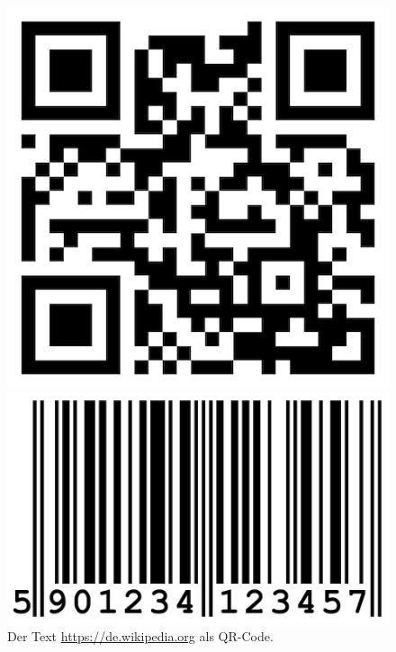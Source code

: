 \begin{figure}[htb]
\centering
\begin{minipage}{0.3\textwidth}
\centering
\includegraphics[scale=0.15]{qr_code}
\caption{Der Text \url{https://de.wikipedia.org} als \protect\acs{QR}-Code.}
\label{figure-qr-code}
\end{minipage}
\hfill
\begin{minipage}{0.3\textwidth}
\centering
\includegraphics[scale=0.1]{ean13}

\end{minipage}
\end{figure}
